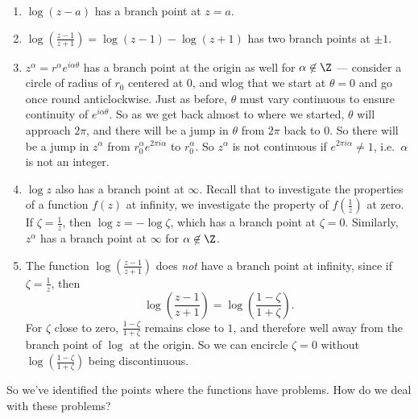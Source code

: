 \documentclass[a4paper]{article}
\begin{document}
\begin{eg}\leavevmode
  \begin{enumerate}
    \item $\log (z - a)$ has a branch point at $z = a$.
    \item $\log\left(\frac{z - 1}{z + 1}\right) = \log(z - 1) - \log(z + 1)$ has two branch points at $\pm 1$.
    \item $z^\alpha = r^\alpha e^{i\alpha \theta}$ has a branch point at the origin as well for $\alpha \not\in \Z$ --- consider a circle of radius of $r_0$ centered at $0$, and wlog that we start at $\theta = 0$ and go once round anticlockwise. Just as before, $\theta$ must vary continuous to ensure continuity of $e^{i\alpha \theta}$. So as we get back almost to where we started, $\theta$ will approach $2\pi$, and there will be a jump in $\theta$ from $2\pi$ back to $0$. So there will be a jump in $z^\alpha$ from $r_0^{\alpha} e^{2\pi i \alpha}$ to $r_0^\alpha$. So $z^\alpha$ is not continuous if $e^{2\pi i \alpha} \not= 1$, i.e.\ $\alpha$ is not an integer.
    \item $\log z$ also has a branch point at $\infty$. Recall that to investigate the properties of a function $f(z)$ at infinity, we investigate the property of $f\left(\frac{1}{z}\right)$ at zero. If $\zeta = \frac{1}{z}$, then $\log z = - \log \zeta$, which has a branch point at $\zeta = 0$. Similarly, $z^{\alpha}$ has a branch point at $\infty$ for $\alpha \not\in \Z$.
    \item The function $\log\left(\frac{z - 1}{z + 1}\right)$ does \emph{not} have a branch point at infinity, since if $\zeta = \frac{1}{z}$, then
      \[
        \log\left(\frac{z - 1}{z + 1}\right) = \log\left(\frac{1 - \zeta}{1 + \zeta}\right).
      \]
      For $\zeta$ close to zero, $\frac{1 - \zeta}{1 + \zeta}$ remains close to $1$, and therefore well away from the branch point of $\log$ at the origin. So we can encircle $\zeta = 0$ without $\log\left(\frac{1 - \zeta}{1 + \zeta}\right)$ being discontinuous.
  \end{enumerate}
\end{eg}
So we've identified the points where the functions have problems. How do we deal with these problems?
\end{document}
